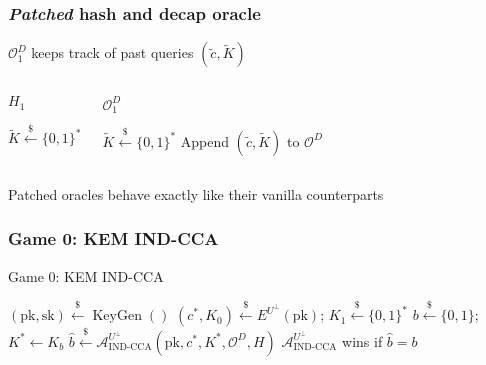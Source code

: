 \documentclass{beamer}
\newcommand{\leftsample}{\overset{{\scriptscriptstyle\$}}{\leftarrow}}
\begin{document}
\begin{frame}
    \frametitle{\textit{Patched} hash and decap oracle}

    $\mathcal{O}^D_1$ keeps track of past queries $(\tilde{c}, \tilde{K})$

    \begin{columns}
        \begin{algorithm}[H]
            \SetAlgoLined
            \caption{$H_1$}
            $\tilde{K} \leftsample \{0, 1\}^\ast$\;


            \;
        \end{algorithm}

        \begin{algorithm}[H]
            \SetAlgoLined
            \caption{$\mathcal{O}^D_1$}
            $\tilde{K} \leftsample \{0, 1\}^\ast$\;
            Append $(\tilde{c}, \tilde{K})$ to $\mathcal{O}^D$\;
            \;
        \end{algorithm}
    \end{columns}

    Patched oracles behave exactly like their vanilla counterparts
\end{frame}

\begin{frame}
    \frametitle{Game 0: KEM IND-CCA}

    \begin{algorithm}[H]
        \SetAlgoLined
        \caption{Game 0: KEM IND-CCA}
        $(\text{pk}, \text{sk}) \leftsample \operatorname{KeyGen}()$\;
        $(c^\ast, K_0) \leftsample E^{U^\bot}(\text{pk})$;
        $K_1 \leftsample \{0, 1\}^\ast$\;
        $b \leftsample\{0,1\}$;
        $K^\ast \leftarrow K_b$\;
        $\hat{b} \leftsample \mathcal{A}^{U^\bot}_\text{IND-CCA}(
            \text{pk}, c^\ast, K^\ast, \mathcal{O}^D, H
        )$\;
        $\mathcal{A}^{U^\bot}_\text{IND-CCA}$ wins if $\hat{b} = b$
    \end{algorithm}
\end{frame}
\end{document}
